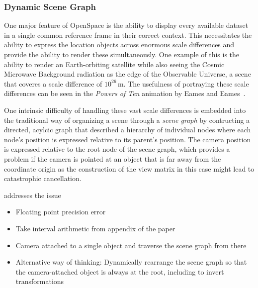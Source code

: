 \subsubsection{Dynamic Scene Graph} \label{contributions:astro:openspace:dsg}
One major feature of OpenSpace is the ability to display every available dataset in a single common reference frame in their correct context.  This necessitates the ability to express the location objects across enormous scale differences and provide the ability to render these simultaneously.  One example of this is the ability to render an Earth-orbiting satellite while also seeing the Cosmic Microwave Background radiation as the edge of the Observable Universe, a scene that coveres a scale difference of $10^26\,$m.  The usefulness of portraying these scale differences can be seen in the \emph{Powers of Ten} animation by Eames and Eames~\cite{morrison1982powers}.

One intrinsic difficulty of handling these vast scale differences is embedded into the traditional way of organizing a scene through a \emph{scene graph} by contructing a directed, acylcic graph that described a hierarchy of individual nodes where each node's position is expressed relative to its parent's position.  The camera position is expressed relative to the root node of the scene graph, which provides a problem if the camera is pointed at an object that is far away from the coordinate origin as the construction of the view matrix in this case might lead to catastrophic cancellation.

 addresses the issue 
\begin{itemize}
    \item Floating point precision error
    \item Take interval arithmetic from appendix of the paper
    \item Camera attached to a single object and traverse the scene graph from there
    \item Alternative way of thinking:  Dynamically rearrange the scene graph so that the camera-attached object is always at the root, including to invert transformations
\end{itemize}

